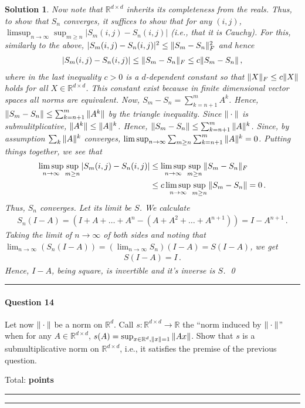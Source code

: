\documentclass{article}
\newcommand{\R}{\mathbb{R}}
\DeclareMathOperator*{\1}{\mathbbm{1}}
\newcommand{\RR}{\mathbb{R}}
\newcounter{DocPoints} %
\newcounter{QuestionPoints} %
\newcommand{\tpoints}[1]{        %
	\ifthenelse{\isempty{#1}}%
	{%
	}%
	{%
		\addtocounter{DocPoints}{#1}
		\addtocounter{QuestionPoints}{#1}
	}													 %
	\par\mbox{}\par\noindent\hfill {Total: \bf \arabic{QuestionPoints}\xspace points}\par\mbox{}\par\hrule\hrule
	\setcounter{QuestionPoints}{0}
}
\newtheorem*{solution*}{Solution}
\begin{document}
\begin{solution*}
Now note that $\RR^{d\times d}$ inherits its completeness from the reals.
Thus, to show that $S_n$ converges, it suffices to show that for any $(i,j)$,
$\limsup_{n\to\infty} \sup_{m\ge n} |S_m(i,j)-S_n(i,j)|$ (i.e., that it is Cauchy).
For this, similarly to the above,
$|S_m(i,j) - S_n(i,j)|^2 \le \| S_m - S_n \|^2_F$
and hence
\begin{align*}
|S_m(i,j) - S_n(i,j)| \le \| S_m - S_n \|_F \le c \|S_m - S_n\|\,,
\end{align*}
where in the last inequality $c>0$ is a $d$-dependent constant so that 
$\|X\|_F\le c \|X\|$ holds for all $X\in \RR^{d\times d}$.
This constant exist because in finite dimensional vector spaces all norms are equivalent.
Now, $S_m-S_n = \sum_{k=n+1}^m A^k$. Hence, $\|S_m-S_n\| \le \sum_{k=n+1}^m \|A^k\|$ by the triangle inequality.
Since $\|\cdot\|$ is submulitplicative, $\|A^k\|\le \|A\|^k$. Hence, $\|S_m - S_n\| \le \sum_{k=n+1}^m \|A\|^k$. Since, by assumption $\sum_k \|A\|^k$ converges, 
$\limsup_{n\to\infty} \sum_{m\ge n} \sum_{k=n+1}^m \|A\|^k = 0$.
Putting things together, we see that 
\begin{align*}
\limsup_{n\to\infty} \sup_{m\ge n} |S_m(i,j) - S_n(i,j)| 
& \le \limsup_{n\to\infty}  \sup_{m\ge n} \| S_m - S_n \|_F \\
& \le c \limsup_{n\to\infty} \sup_{m\ge n}  \|S_m - S_n\| = 0\,.
\end{align*}
Thus, $S_n$ converges. Let its limit be $S$.
We calculate
\begin{align*}
 S_n  (I-A) =  (I+A+\dots+A^n - (A+A^2 + \dots + A^{n+1})) = I-A^{n+1}\,.
\end{align*}
Taking the limit of $n\to \infty$ of both sides and noting that $\lim_{n\to\infty} (S_n(I-A)) = (\lim_{n\to\infty} S_n)(I-A) = S(I-A)$, we get
\begin{align*}
S (I-A)  = I\,.
\end{align*}
Hence, $I-A$, being square, is invertible and it's inverse is $S$.
\qed\par\bigskip\par\hrule
\end{solution*}


\paragraph{Question 14}
Let now $\|\cdot\|$ be a norm on $\R^d$.
Call $s: \R^{d\times d} \to \R$ the ``norm induced by $\|\cdot\|$'' when for any $A\in \R^{d\times d}$, $s(A) = \sup_{x\in \R^d, \norm{x}=1} \norm{ A x}$.
Show that $s$ is a submultiplicative norm on $\R^{d\times d}$, i.e., it satisfies the premise of the previous question. 
\tpoints{5}
\end{document}
